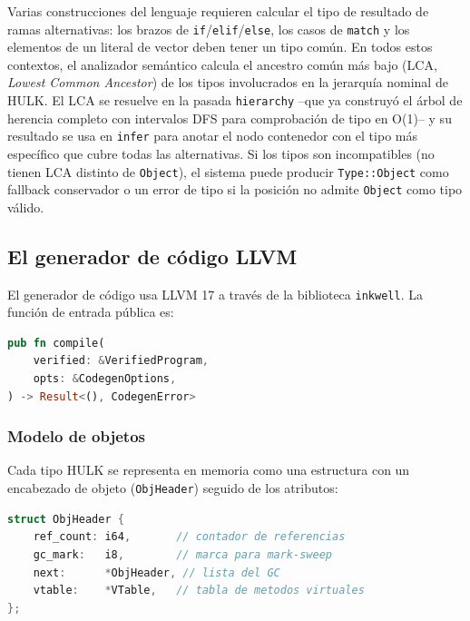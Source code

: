 \documentclass[12pt, a4paper]{article}
\begin{document}
Varias construcciones del lenguaje requieren calcular el tipo de resultado de
ramas alternativas: los brazos de \texttt{if}/\texttt{elif}/\texttt{else}, los
casos de \texttt{match} y los elementos de un literal de vector deben tener un
tipo común. En todos estos contextos, el analizador semántico calcula el
ancestro común más bajo (LCA, \textit{Lowest Common Ancestor}) de los tipos 
involucrados en la jerarquía nominal de HULK. El LCA se resuelve en la pasada 
\texttt{hierarchy} --que ya construyó el árbol de herencia completo con intervalos 
DFS para comprobación de tipo en O(1)-- y su resultado se usa en \texttt{infer} 
para anotar el nodo contenedor con el tipo más específico que cubre todas las 
alternativas. Si los tipos son incompatibles (no tienen LCA distinto de \texttt{Object}), 
el sistema puede producir \texttt{Type::Object} como fallback conservador o un error de 
tipo si la posición no admite \texttt{Object} como tipo válido.

\subsection{El generador de c\'{o}digo LLVM}

El generador de c\'{o}digo usa LLVM 17 a trav\'{e}s de la biblioteca
\texttt{inkwell}. La funci\'{o}n de entrada p\'{u}blica es:

\begin{lstlisting}[language=Rust, caption={API p\'{u}blica de hulk-codegen},
                   label=lst:codegen-api]
pub fn compile(
    verified: &VerifiedProgram,
    opts: &CodegenOptions,
) -> Result<(), CodegenError>
\end{lstlisting}

\subsubsection{Modelo de objetos}

Cada tipo HULK se representa en memoria como una estructura con un
encabezado de objeto (\texttt{ObjHeader}) seguido de los atributos:

\begin{lstlisting}[language=C, caption={Layout de objetos en memoria},
                   label=lst:obj-layout]
struct ObjHeader {
    ref_count: i64,       // contador de referencias
    gc_mark:   i8,        // marca para mark-sweep
    next:      *ObjHeader, // lista del GC
    vtable:    *VTable,   // tabla de metodos virtuales
};
\end{lstlisting}
\end{document}
